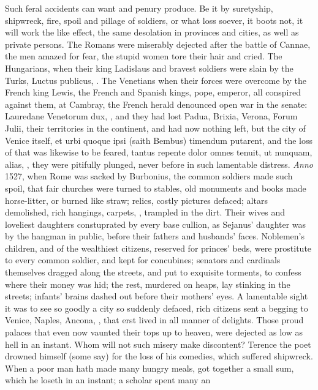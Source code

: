 {Such feral accidents can want and penury produce. Be it by suretyship,
shipwreck, fire, spoil and pillage of soldiers, or what loss soever, it
boots not, it will work the like effect, the same desolation in
provinces and cities, as well as private persons. The Romans were
miserably dejected after the battle of Cannae, the men amazed for fear,
the stupid women tore their hair and cried. The Hungarians, when their
king Ladislaus and bravest soldiers were slain by the Turks, Luctus
publicus, \etc{}. The Venetians when their forces were overcome by the
French king Lewis, the French and Spanish kings, pope, emperor, all
conspired against them, at Cambray, the French herald denounced open
war in the senate: Lauredane Venetorum dux, \etc{}, and they had lost
Padua, Brixia, Verona, Forum Julii, their territories in the continent,
and had now nothing left, but the city of Venice itself, et urbi quoque
ipsi (saith Bembus) timendum putarent, and the loss of that was
likewise to be feared, tantus repente dolor omnes tenuit, ut nunquam,
alias, \etc{}, they were pitifully plunged, never before in such
lamentable distress. \emph{Anno} 1527, when Rome was sacked by Burbonius,
the common soldiers made such spoil, that fair churches were
turned to stables, old monuments and books made horse-litter, or burned
like straw; relics, costly pictures defaced; altars demolished, rich
hangings, carpets, \etc{}, trampled in the dirt. Their wives and
loveliest daughters constuprated by every base cullion, as Sejanus'
daughter was by the hangman in public, before their fathers and
husbands' faces. Noblemen's children, and of the wealthiest citizens,
reserved for princes' beds, were prostitute to every common soldier,
and kept for concubines; senators and cardinals themselves dragged
along the streets, and put to exquisite torments, to confess where
their money was hid; the rest, murdered on heaps, lay stinking in the
streets; infants' brains dashed out before their mothers' eyes. A
lamentable sight it was to see so goodly a city so suddenly defaced,
rich citizens sent a begging to Venice, Naples, Ancona, \etc{}, that erst
lived in all manner of delights. Those proud palaces that even
now vaunted their tops up to heaven, were dejected as low as hell in an
instant. Whom will not such misery make discontent? Terence the poet
drowned himself (some say) for the loss of his comedies, which suffered
shipwreck. When a poor man hath made many hungry meals, got together a
small sum, which he loseth in an instant; a scholar spent many an
}
